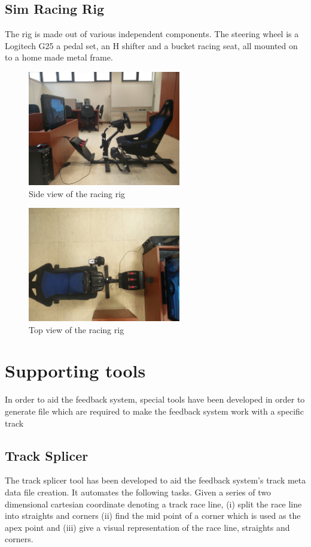 \subsection{Sim Racing Rig}
\label{sec:imp-simRacingRig}
The rig is made out of various independent components. The steering wheel is a Logitech G25 a pedal set, an H shifter and a bucket racing seat, all mounted on to a home made metal frame.

\begin{figure}[!htb]
	\centering
	\includegraphics[height=5cm]{images/RacingRig}
	\caption{Side view of the racing rig}
	\label{fig:RacingRig}
\end{figure}

\begin{figure}[!htb]
	\centering
	\includegraphics[height=5cm]{images/RacingRig2}
	\caption{Top view of the racing rig}
	\label{fig:RacingRigBirdsEye}
\end{figure}

\section{Supporting tools}
\label{sec:imp-supportingTools}
In order to aid the feedback system, special tools have been developed in order to generate file which are required to make the feedback system work with a specific track

\subsection{Track Splicer}
\label{sec:imp-trackSplicer}
The track splicer tool has been developed to aid the feedback system's track meta data file creation. It automates the following tasks. Given a series of two dimensional cartesian coordinate denoting a track race line, (i) split the race line into straights and corners (ii) find the mid point of a corner which is used as the apex point and (iii) give a visual representation of the race line, straights and corners. 

